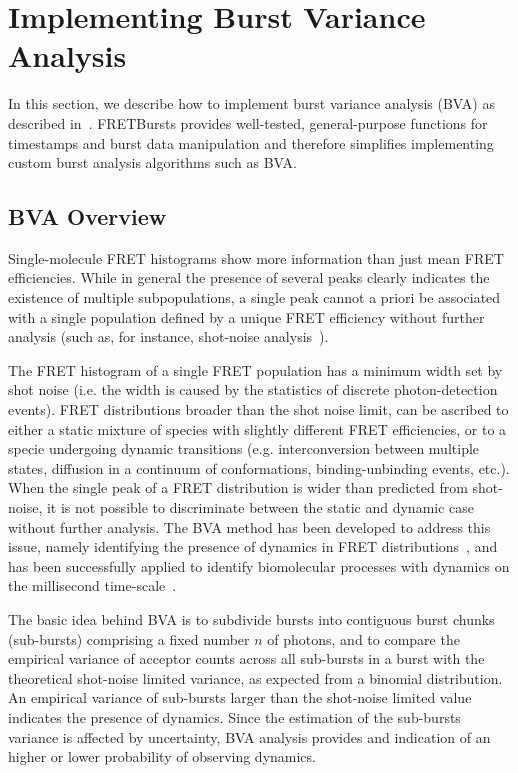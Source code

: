 \section{Implementing Burst Variance Analysis}

\label{sec:bva}
In this section, we describe how to implement burst variance analysis (BVA) 
as described in~\cite{Torella_2011}.
FRETBursts provides well-tested, general-purpose functions for timestamps and burst data 
manipulation and therefore simplifies implementing custom burst analysis algorithms such as BVA.

\subsection{BVA Overview}
Single-molecule FRET histograms show more information than just mean FRET efficiencies. 
While in general the presence of several peaks clearly indicates the existence of 
multiple subpopulations, a single peak cannot a priori be associated with 
a single population defined by a unique FRET efficiency without further analysis 
(such as, for instance, shot-noise analysis~\cite{Nir_2006,Antonik2006}).

The FRET histogram of a single FRET population has a minimum width set by shot noise 
(i.e. the width is caused by the statistics of discrete photon-detection events). 
FRET distributions broader than the shot noise limit, 
can be ascribed to either a static mixture of species with slightly different FRET efficiencies, 
or to a specie undergoing dynamic transitions (e.g. interconversion between multiple states,
diffusion in a continuum of conformations, binding-unbinding events, etc.).
When the single peak of a FRET distribution is wider than predicted from shot-noise, 
it is not possible to discriminate between the static and dynamic case without further analysis.
The BVA method has been developed to address this issue, namely identifying the presence of dynamics 
in FRET distributions~\cite{Torella_2011}, 
and has been successfully applied to identify biomolecular processes with 
dynamics on the millisecond time-scale~\cite{Torella_2011, Robb_2013}.

The basic idea behind BVA is to subdivide bursts into contiguous burst chunks (sub-bursts)
comprising a fixed number $n$ of photons,
and to compare the empirical variance of acceptor counts across all sub-bursts in a burst 
with the theoretical shot-noise limited variance, as expected from a binomial distribution.
An empirical variance of sub-bursts larger than the shot-noise limited value indicates
the presence of dynamics. Since the estimation of the sub-bursts variance is affected
by uncertainty, BVA analysis provides and indication of an higher or lower probability
of observing dynamics.

